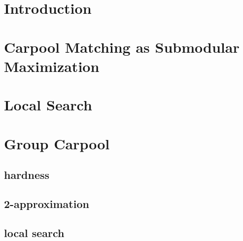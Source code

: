 \begin{abstract}

\end{abstract}

\section{Introduction}


\section{Carpool Matching as Submodular Maximization}
\label{sec:sub}


\section{Local Search}
\label{sec:local}


\section{Group Carpool}
\label{sec:group}

	\subsection{hardness}
	
	\subsection{2-approximation}
	
	\subsection{local search}
	
